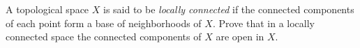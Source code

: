 \documentclass[12pt]{exam}
\theoremstyle{definition}
\begin{document}
\begin{questions}









\question A topological space $X$ is said to be \emph{locally
connected} if the connected components of each point form a base of
neighborhoods of $X$. Prove that in a locally connected space the
connected components of $X$ are open in $X$.






\end{questions}
\end{document}
